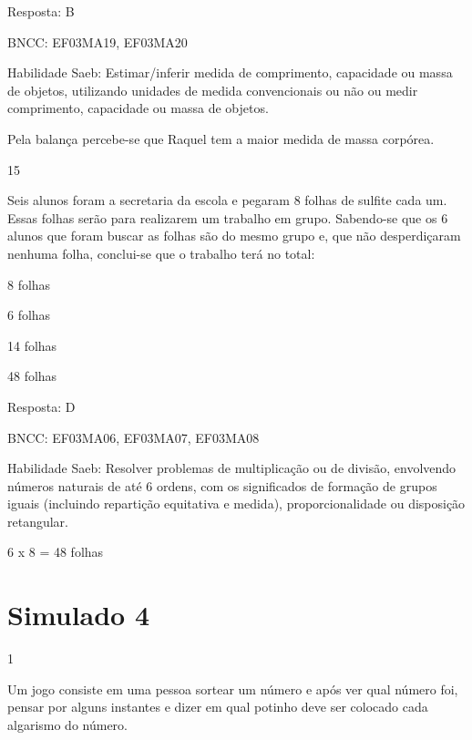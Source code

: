 \begin{escolha}
{\begin{escolha}
{Resposta: B

BNCC: EF03MA19, EF03MA20

Habilidade Saeb: Estimar/inferir medida de comprimento, capacidade ou
massa de objetos, utilizando unidades de medida convencionais ou não ou
medir comprimento, capacidade ou massa de objetos.

Pela balança percebe-se que Raquel tem a maior medida de massa corpórea.

\num{15}

Seis alunos foram a secretaria da escola e pegaram 8 folhas de sulfite
cada um. Essas folhas serão para realizarem um trabalho em grupo.
Sabendo-se que os 6 alunos que foram buscar as folhas são do mesmo grupo
e, que não desperdiçaram nenhuma folha, conclui-se que o trabalho terá
no total:

\begin{escolha}

\item
  8 folhas
\item
  6 folhas
\item
  14 folhas
\item
  48 folhas
\end{escolha}

Resposta: D

BNCC: EF03MA06, EF03MA07, EF03MA08

Habilidade Saeb: Resolver problemas de multiplicação ou de divisão,
envolvendo números naturais de até 6 ordens, com os significados de
formação de grupos iguais (incluindo repartição equitativa e medida),
proporcionalidade ou disposição retangular.

6 x 8 = 48 folhas

\chapter{Simulado 4}

\num{1}

Um jogo consiste em uma pessoa sortear um número e após ver qual número
foi, pensar por alguns instantes e dizer em qual potinho deve ser
colocado cada algarismo do número.

}
\end{escolha}}
\end{escolha}
